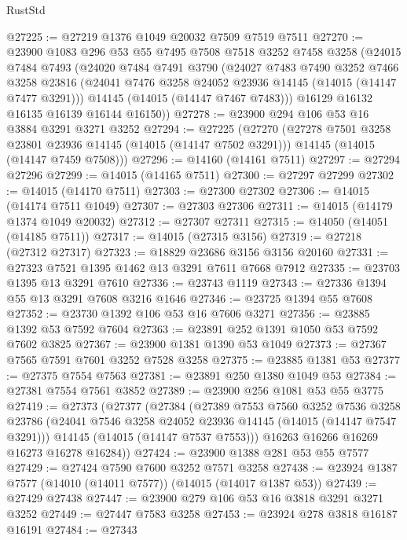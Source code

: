 \begin{lexlean}{RustStd}
\begin{coremodule}
@27225 := @27219 @1376 @1049 @20032 @7509 @7519 @7511
@27270 := @23900
    @1083
    @296
    @53
    @55
    @7495
    @7508
    @7518
    @3252
    @7458
    @3258
    (@24015
      @7484
      @7493
      (@24020
        @7484
        @7491
        @3790
        (@24027
          @7483
          @7490
          @3252
          @7466
          @3258
          @23816
          (@24041 @7476 @3258 @24052 @23936 @14145 (@14015 (@14147 @7477 @3291)))
          @14145
          (@14015 (@14147 @7467 @7483)))
        @16129
        @16132
        @16135
        @16139
        @16144
        @16150))
@27278 := @23900 @294 @106 @53 @16 @3884 @3291 @3271 @3252
@27294 := @27225
    (@27270
      (@27278 @7501 @3258 @23801 @23936 @14145 (@14015 (@14147 @7502 @3291)))
      @14145
      (@14015 (@14147 @7459 @7508)))
@27296 := @14160 (@14161 @7511)
@27297 := @27294 @27296
@27299 := @14015 (@14165 @7511)
@27300 := @27297 @27299
@27302 := @14015 (@14170 @7511)
@27303 := @27300 @27302
@27306 := @14015 (@14174 @7511 @1049)
@27307 := @27303 @27306
@27311 := @14015 (@14179 @1374 @1049 @20032)
@27312 := @27307 @27311
@27315 := @14050 (@14051 (@14185 @7511))
@27317 := @14015 (@27315 @3156)
@27319 := @27218 (@27312 @27317)
@27323 := @18829 @23686 @3156 @3156 @20160
@27331 := @27323 @7521 @1395 @1462 @13 @3291 @7611 @7668 @7912
@27335 := @23703 @1395 @13 @3291 @7610
@27336 := @23743 @1119
@27343 := @27336 @1394 @55 @13 @3291 @7608 @3216 @1646
@27346 := @23725 @1394 @55 @7608
@27352 := @23730 @1392 @106 @53 @16 @7606 @3271
@27356 := @23885 @1392 @53 @7592 @7604
@27363 := @23891 @252 @1391 @1050 @53 @7592 @7602 @3825
@27367 := @23900 @1381 @1390 @53 @1049
@27373 := @27367 @7565 @7591 @7601 @3252 @7528 @3258
@27375 := @23885 @1381 @53
@27377 := @27375 @7554 @7563
@27381 := @23891 @250 @1380 @1049 @53
@27384 := @27381 @7554 @7561 @3852
@27389 := @23900 @256 @1081 @53 @55 @3775
@27419 := @27373
    (@27377
      (@27384
        (@27389
          @7553
          @7560
          @3252
          @7536
          @3258
          @23786
          (@24041 @7546 @3258 @24052 @23936 @14145 (@14015 (@14147 @7547 @3291)))
          @14145
          (@14015 (@14147 @7537 @7553)))
        @16263
        @16266
        @16269
        @16273
        @16278
        @16284))
@27424 := @23900 @1388 @281 @53 @55 @7577
@27429 := @27424 @7590 @7600 @3252 @7571 @3258
@27438 := @23924 @1387 @7577 (@14010 (@14011 @7577)) (@14015 (@14017 @1387 @53))
@27439 := @27429 @27438
@27447 := @23900 @279 @106 @53 @16 @3818 @3291 @3271 @3252
@27449 := @27447 @7583 @3258
@27453 := @23924 @278 @3818 @16187 @16191
@27484 := @27343

\end{coremodule}
\end{lexlean}
